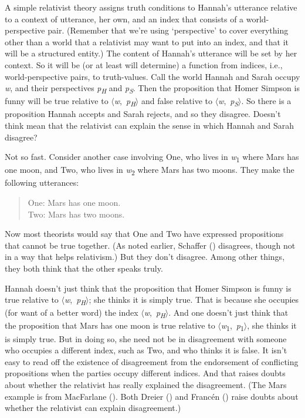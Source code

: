 \documentclass[
  10pt,
  letterpaper,
  DIV=11,
  numbers=noendperiod,
  twoside]{scrartcl}
\begin{document}
A simple relativist theory assigns truth conditions to Hannah's
utterance relative to a context of utterance, her own, and an index that
consists of a world-perspective pair. (Remember that we're using
`perspective' to cover everything other than a world that a relativist
may want to put into an index, and that it will be a structured entity.)
The content of Hannah's utterance will be set by her context. So it will
be (or at least will determine) a function from indices, i.e.,
world-perspective pairs, to truth-values. Call the world Hannah and
Sarah occupy \emph{w}, and their perspectives \emph{p\textsubscript{H}}
and \emph{p\textsubscript{S}}. Then the proposition that Homer Simpson
is funny will be true relative to
\(\langle\)\emph{w},~\emph{p\textsubscript{H}}\(\rangle\) and false
relative to \(\langle\)\emph{w},~\emph{p\textsubscript{S}}\(\rangle\).
So there is a proposition Hannah accepts and Sarah rejects, and so they
disagree. Doesn't think mean that the relativist can explain the sense
in which Hannah and Sarah disagree?

Not so fast. Consider another case involving One, who lives in
\emph{w}\textsubscript{1} where Mars has one moon, and Two, who lives in
\emph{w}\textsubscript{2} where Mars has two moons. They make the
following utterances:

\begin{quote}
One: Mars has one moon.\\
Two: Mars has two moons.
\end{quote}

Now most theorists would say that One and Two have expressed
propositions that cannot be true together. (As noted earlier, Schaffer
() disagrees, though not in a way that
helps relativism.) But they don't disagree. Among other things, they
both think that the other speaks truly.

Hannah doesn't just think that the proposition that Homer Simpson is
funny is true relative to
\(\langle\)\emph{w},~\emph{p\textsubscript{H}}\(\rangle\); she thinks it
is simply true. That is because she occupies (for want of a better word)
the index \(\langle\)\emph{w},~\emph{p\textsubscript{H}}\(\rangle\). And
one doesn't just think that the proposition that Mars has one moon is
true relative to
\(\langle\)\emph{w}\textsubscript{1},~\emph{p}\textsubscript{1}\(\rangle\),
she thinks it is simply true. But in doing so, she need not be in
disagreement with someone who occupies a different index, such as Two,
and who thinks it is false. It isn't easy to read off the existence of
disagreement from the endorsement of conflicting propositions when the
parties occupy different indices. And that raises doubts about whether
the relativist has really explained the disagreement. (The Mars example
is from MacFarlane (). Both
Dreier () and Francén
() raise doubts about whether the
relativist can explain disagreement.)
\end{document}
